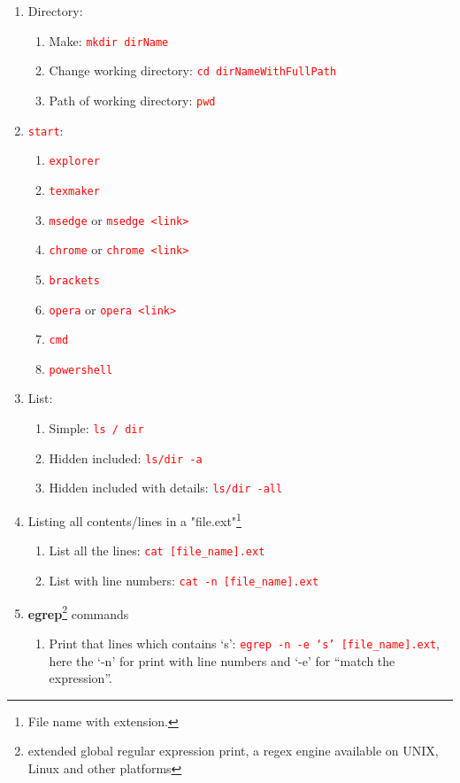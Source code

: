 \documentclass[12 pt, letterpaper]{extarticle}
\newcommand{\R}{\textcolor{red}} %
\newcommand{\T}{\texttt}
\begin{document}
\begin{enumerate}
	\item Directory:
	      \begin{enumerate}
		      \item Make: \R{\T{mkdir dirName}}
		      \item Change working directory: \R{\T{cd dirNameWithFullPath}}
		      \item Path of working directory: \R{\T{pwd}}
	      \end{enumerate}

	\item \R{\T{start}}:
	      \begin{enumerate}
		      \item \R{\T{explorer}}
		      \item \R{\T{texmaker}}
		      \item \R{\T{msedge}} or \R{\T{msedge <link>}}
		      \item \R{\T{chrome}} or \R{\T{chrome <link>}}
		      \item \R{\T{brackets}}
		      \item \R{\T{opera}} or \R{\T{opera <link>}}

		      \item \R{\T{cmd}}
		      \item \R{\T{powershell}}
	      \end{enumerate}

	\item List:
	      \begin{enumerate}
		      \item Simple: \R{\T{ls / dir}}
		      \item Hidden included: \R{\T{ls/dir -a}}
		      \item Hidden included with details: \R{\T{ls/dir -all}}
	      \end{enumerate}

	\item Listing all contents/lines in a "file.ext"\footnote{File name with extension.}
	      \begin{enumerate}
		      \item List all the lines: \R{\T{cat [file\_name].ext}}
		      \item List with line numbers: \R{\T{cat -n [file\_name].ext}}
	      \end{enumerate}

	\item \textbf{egrep}\footnote{extended global regular expression print, a regex engine available on UNIX, Linux and other platforms} commands
	      \begin{enumerate}
		      \item Print that lines which contains \enquote*{s}: \R{\T{egrep -n -e \enquote*{s} [file\_name].ext}}, here the \enquote*{-n} for print with line numbers and \enquote*{-e} for \enquote{match the expression}.
	      \end{enumerate}


\end{enumerate}
\end{document}
